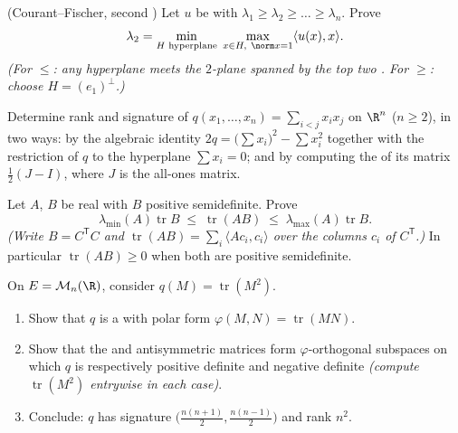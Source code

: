 \begin{exercise}[$\star\star\star$]\label{exo:b2:quadratic:9}
(Courant--Fischer, second ) Let $u$ be  with
 $\lambda_1 \geq \lambda_2 \geq \dots \geq \lambda_n$.
Prove
\[
\lambda_2 = \min_{\substack{H \text{ hyperplane}}}\;
\max_{\substack{x \in H,\ \norm x = 1}} \langle u(x), x\rangle .
\]
\emph{(For $\leq$: any hyperplane meets the $2$-plane spanned by
the top two . For $\geq$: choose $H =
(e_1)^{\perp}$.)}
\end{exercise}

\begin{exercise}[$\star\star$]\label{exo:b2:quadratic:10}
Determine rank and signature of $q(x_1, \dots, x_n) = \sum_{i <
j} x_ix_j$ on $\R^n$ ($n \geq 2$), in two ways: by the algebraic
identity $2q = \bigl(\sum x_i\bigr)^2 - \sum x_i^2$ together
with the restriction of $q$ to the hyperplane $\sum x_i = 0$;
and by computing the  of its matrix $\frac12(J - I)$,
where $J$ is the all-ones matrix.
\end{exercise}

\begin{exercise}[$\star\star$]\label{exo:b2:quadratic:11}
Let $A$, $B$ be real  with $B$ positive semidefinite.
Prove
\[
\lambda_{\min}(A)\operatorname{tr} B
\;\leq\;
\operatorname{tr}(AB)
\;\leq\;
\lambda_{\max}(A)\operatorname{tr} B .
\]
\emph{(Write $B = C^{\mathsf T}C$ and $\operatorname{tr}(AB) =
\sum_i \langle A c_i, c_i\rangle$ over the columns $c_i$ of
$C^{\mathsf T}$.)} In particular $\operatorname{tr}(AB) \geq 0$
when both are positive semidefinite.
\end{exercise}

\begin{exercise}[$\star\star\star$]\label{exo:b2:quadratic:12}
On $E = \mathcal{M}_n(\R)$, consider $q(M) =
\operatorname{tr}(M^2)$.
\begin{enumerate}
  \item Show that $q$ is a  with polar form
        $\varphi(M, N) = \operatorname{tr}(MN)$.
  \item Show that the  and antisymmetric matrices form
        $\varphi$-orthogonal subspaces on which $q$ is
        respectively positive definite and negative definite
        \emph{(compute $\operatorname{tr}(M^2)$ entrywise in
        each case)}.
  \item Conclude: $q$ has signature $\bigl(\frac{n(n+1)}{2},
        \frac{n(n-1)}{2}\bigr)$ and rank $n^2$.
\end{enumerate}
\end{exercise}

